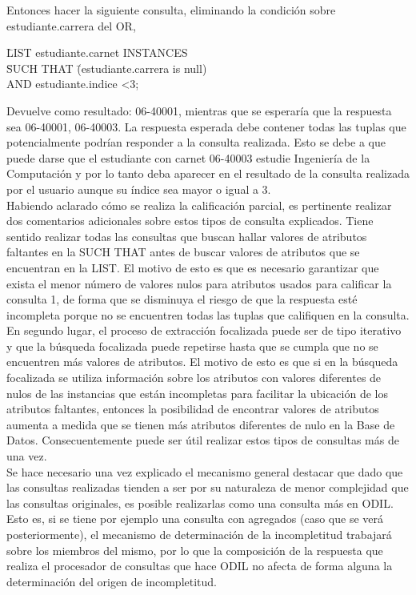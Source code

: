 Entonces hacer la siguiente consulta, eliminando la condición sobre estudiante.carrera del OR, 

\begin{tabbing}	
\= LIST estudiante.carnet \+ INSTANCES \\
\= SUCH THAT \= (estudiante.carrera  is null) \\
\> \> AND estudiante.indice \textless 3; \\
\end{tabbing}

Devuelve como resultado: 06-40001, mientras que se esperaría que la respuesta sea 06-40001, 06-40003. La respuesta esperada debe contener todas las tuplas que potencialmente podrían responder a la consulta realizada. Esto se debe a que puede darse que el estudiante con carnet 06-40003 estudie Ingeniería de la Computación y por lo tanto deba aparecer en el resultado de la consulta realizada por el usuario aunque su índice sea mayor o igual a 3. \\

Habiendo aclarado cómo se realiza la calificación parcial, es pertinente realizar dos comentarios adicionales sobre estos tipos de consulta explicados. Tiene sentido realizar todas las consultas que buscan hallar valores de atributos faltantes en la SUCH THAT antes de buscar valores de atributos que se encuentran en la LIST. El motivo de esto es que es necesario garantizar que exista el menor número de valores nulos para atributos usados para calificar la consulta 1, de forma que se disminuya el riesgo de que la respuesta esté incompleta porque no se encuentren todas las tuplas que califiquen en la consulta. \\

En segundo lugar, el proceso de extracción focalizada puede ser de tipo iterativo y que la búsqueda focalizada puede repetirse hasta que se cumpla que no se encuentren más valores de atributos. El motivo de esto es que si en la búsqueda focalizada se utiliza información sobre los atributos con valores diferentes de nulos de las instancias que están incompletas para facilitar la ubicación de los atributos faltantes, entonces la posibilidad de encontrar valores de atributos aumenta a medida que se tienen más atributos diferentes de nulo en la Base de Datos. Consecuentemente puede ser útil realizar estos tipos de consultas más de una vez. \\

Se hace necesario una vez explicado el mecanismo general destacar que dado que las consultas realizadas tienden a ser por su naturaleza de menor complejidad que las consultas originales, es posible realizarlas como una consulta más en ODIL. Esto es, si se tiene por ejemplo una consulta con agregados (caso que se verá posteriormente), el mecanismo de determinación de la incompletitud trabajará sobre los miembros del mismo, por lo que la composición de la respuesta que realiza el procesador de consultas que hace ODIL no afecta de forma alguna la determinación del origen de incompletitud.\\

